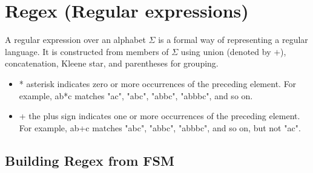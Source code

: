 \documentclass{article}
\begin{document}
\section{Regex (Regular expressions)}

A regular expression over an alphabet $\Sigma$ is a formal way of representing
a regular language. It is constructed from members of $\Sigma$ using union
(denoted by $+$), concatenation, Kleene star, and parentheses for grouping.

\begin{itemize}
	 
		\item * asterisk indicates zero or more occurrences of the preceding element.
		For example, ab*c matches "ac", "abc", "abbc", "abbbc", and so on. 

		\item + the plus sign indicates one or more occurrences of the preceding element.
		For example, ab+c matches "abc", "abbc", "abbbc", and so on, but not "ac". 
\end{itemize}

\subsection{Building Regex from FSM}
\end{document}
